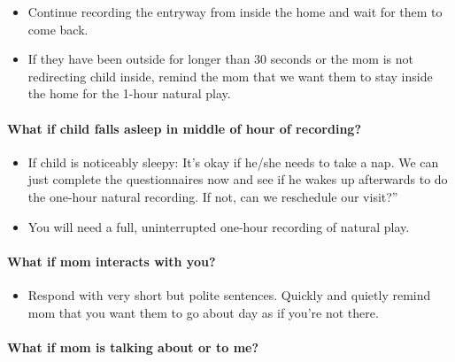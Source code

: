 \documentclass[
  12pt,
]{book}
\providecommand{\tightlist}{%
  \setlength{\itemsep}{0pt}\setlength{\parskip}{0pt}}
\begin{document}
\begin{itemize}
\tightlist
\item
  Continue recording the entryway from inside the home and wait for them to come back.
\item
  If they have been outside for longer than 30 seconds or the mom is not redirecting child inside, remind the mom that we want them to stay inside the home for the 1-hour natural play.
\end{itemize}

\hypertarget{what-if-child-falls-asleep-in-middle-of-hour-of-recording}{%
\paragraph*{What if child falls asleep in middle of hour of recording?}\label{what-if-child-falls-asleep-in-middle-of-hour-of-recording}}

\begin{itemize}
\tightlist
\item
  If child is noticeably sleepy: It's okay if he/she needs to take a nap. We can just complete the questionnaires now and see if he wakes up afterwards to do the one-hour natural recording. If not, can we reschedule our visit?''
\item
  You will need a full, uninterrupted one-hour recording of natural play.
\end{itemize}

\hypertarget{what-if-mom-interacts-with-you}{%
\paragraph*{What if mom interacts with you?}\label{what-if-mom-interacts-with-you}}

\begin{itemize}
\tightlist
\item
  Respond with very short but polite sentences. Quickly and quietly remind mom that you want them to go about day as if you're not there.
\end{itemize}

\hypertarget{what-if-mom-is-talking-about-or-to-me}{%
\paragraph*{What if mom is talking about or to me?}\label{what-if-mom-is-talking-about-or-to-me}}
\end{document}
